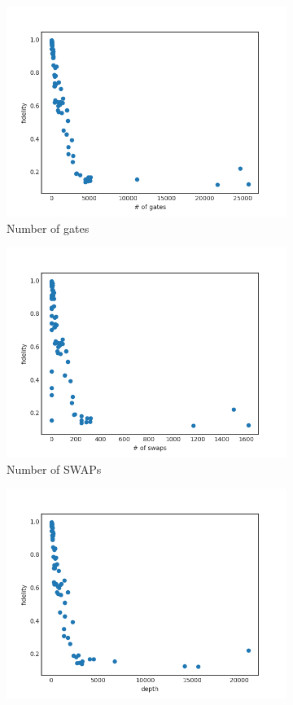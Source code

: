 \documentclass[11pt]{article}
\begin{document}
\begin{figure}[H] 
  \begin{subfigure}[b]{0.5\linewidth}
    \centering
    \includegraphics[width=0.75\linewidth]{f_g_3000} 
    \caption{Number of gates} 
    \label{fig:f_g_3000} 
    \vspace{4ex}
  \end{subfigure}%
  \begin{subfigure}[b]{0.5\linewidth}
    \centering
    \includegraphics[width=0.75\linewidth]{f_s_3000} 
    \caption{Number of SWAPs} 
    \label{fig:f_s_3000} 
    \vspace{4ex}
  \end{subfigure} 
  \begin{subfigure}[b]{0.5\linewidth}
    \centering
    \includegraphics[width=0.75\linewidth]{f_d_3000} 

\end{subfigure}
\end{figure}
\end{document}
